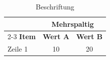 \begin{table}[H]
  \centering
  \begin{tabular}{l c c}
    \toprule
                  & \multicolumn{2}{c}{\textbf{Mehrspaltig}}                   \\
    \cmidrule(lr){2-3}
    \textbf{Item} & \textbf{Wert A}                          & \textbf{Wert B} \\
    \midrule
    Zeile 1       & 10                                       & 20              \\
    \bottomrule
  \end{tabular}
  \caption{Beschriftung}
  \label{tab:tabmulti}
\end{table}